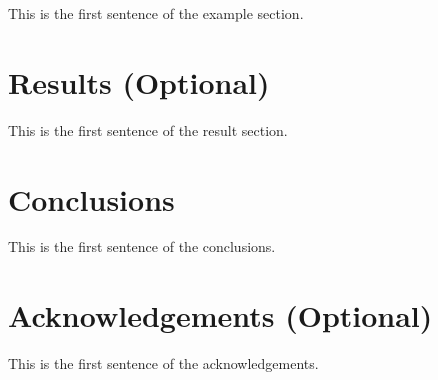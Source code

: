 \documentclass{paris17}
\begin{document}
This is the first sentence of the example section.

\section{Results (Optional)}

This is the first sentence of the result section.


\section{Conclusions}

This is the first sentence of the conclusions.

\section{Acknowledgements (Optional)}

This is the first sentence of the acknowledgements.



\end{document}
